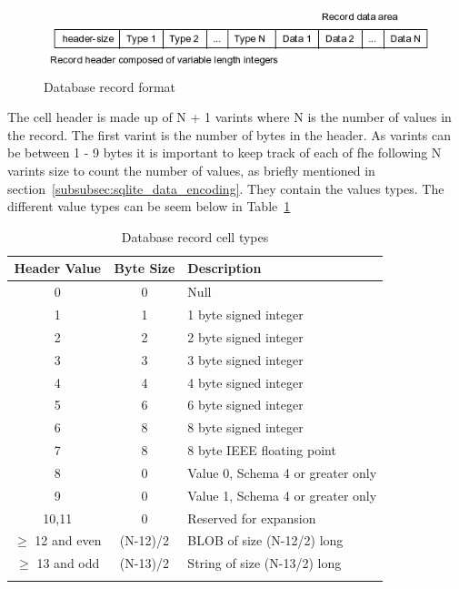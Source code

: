 \begin{figure}[H]
	\centering
	\includegraphics[scale=0.7]{images/recordformat.png}
	\caption{Database record format \citep{sqliteray}}
	\label{fig:sqlite_record_format}
\end{figure}

The cell header is made up of N + 1 varints where N is the number of values in the record. The first varint is the number of bytes in the header. As varints can be between 1 - 9 bytes it is important to keep track of each of fhe following N varints size to count the number of values, as briefly mentioned in section~\ref{subsubsec:sqlite_data_encoding}. They contain the values types. The different value types can be seem below in Table~\ref{tbl:cell_header_record_types} 

\begin{longtable}[h]{| c | c| p{5cm} |}
		\hline
			\textbf{Header Value} & \textbf{Byte Size} & \textbf{Description} \\ 
		\hline
		\endhead
			0 & 0 & Null \\
		\hline
			1 & 1 & 1 byte signed integer \\
		\hline
			2 & 2 & 2 byte signed integer \\
		\hline
			3 & 3 & 3 byte signed integer \\
		\hline
			4 & 4 & 4 byte signed integer \\
		\hline
			5 & 6 & 6 byte signed integer \\
		\hline
			6 & 8 & 8 byte signed integer \\
		\hline
			7 & 8 & 8 byte IEEE floating point \\
		\hline
			8 & 0 & Value 0, Schema 4 or greater only \\
		\hline
			9 & 0 & Value 1, Schema 4 or greater only \\
		\hline
			10,11 & 0 & Reserved for expansion \\
		\hline
			$\geq$ 12 and even & (N-12)/2 & BLOB of size (N-12/2) long \\
		\hline
			$\geq$ 13 and odd & (N-13)/2 & String of size (N-13/2) long \\
		\hline
	\caption{Database record cell types}
	\label{tbl:cell_header_record_types}
\end{longtable}

